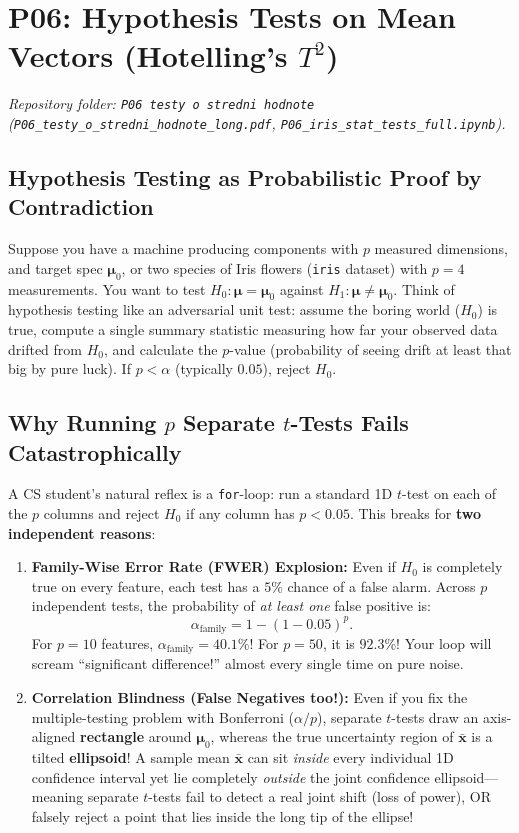 \documentclass[11pt, a4paper]{article}
\begin{document}
\section{P06: Hypothesis Tests on Mean Vectors (Hotelling's $T^2$)}
\emph{Repository folder: \texttt{P06 testy o stredni hodnote} (\texttt{P06\_testy\_o\_stredni\_hodnote\_long.pdf}, \texttt{P06\_iris\_stat\_tests\_full.ipynb}).}

\subsection{Hypothesis Testing as Probabilistic Proof by Contradiction}
Suppose you have a machine producing components with $p$ measured dimensions, and target spec $\boldsymbol{\mu}_0$, or two species of Iris flowers (\texttt{iris} dataset) with $p=4$ measurements. You want to test $H_0: \boldsymbol{\mu} = \boldsymbol{\mu}_0$ against $H_1: \boldsymbol{\mu} \neq \boldsymbol{\mu}_0$.
Think of hypothesis testing like an adversarial unit test: assume the boring world ($H_0$) is true, compute a single summary statistic measuring how far your observed data drifted from $H_0$, and calculate the $p$-value (probability of seeing drift at least that big by pure luck). If $p < \alpha$ (typically $0.05$), reject $H_0$.

\subsection{Why Running $p$ Separate $t$-Tests Fails Catastrophically}
A CS student's natural reflex is a \texttt{for}-loop: run a standard 1D $t$-test on each of the $p$ columns and reject $H_0$ if any column has $p < 0.05$. This breaks for \textbf{two independent reasons}:
\begin{enumerate}
    \item \textbf{Family-Wise Error Rate (FWER) Explosion:} Even if $H_0$ is completely true on every feature, each test has a $5\%$ chance of a false alarm. Across $p$ independent tests, the probability of \emph{at least one} false positive is:
    \[
        \alpha_{\text{family}} = 1 - (1 - 0.05)^p.
    \]
    For $p = 10$ features, $\alpha_{\text{family}} = 40.1\%$! For $p = 50$, it is $92.3\%$! Your loop will scream ``significant difference!'' almost every single time on pure noise.
    \item \textbf{Correlation Blindness (False Negatives too!):} Even if you fix the multiple-testing problem with Bonferroni ($\alpha / p$), separate $t$-tests draw an axis-aligned \textbf{rectangle} around $\boldsymbol{\mu}_0$, whereas the true uncertainty region of $\bar{\mathbf{x}}$ is a tilted \textbf{ellipsoid}! A sample mean $\bar{\mathbf{x}}$ can sit \emph{inside} every individual 1D confidence interval yet lie completely \emph{outside} the joint confidence ellipsoid---meaning separate $t$-tests fail to detect a real joint shift (loss of power), OR falsely reject a point that lies inside the long tip of the ellipse!
\end{enumerate}
\end{document}
